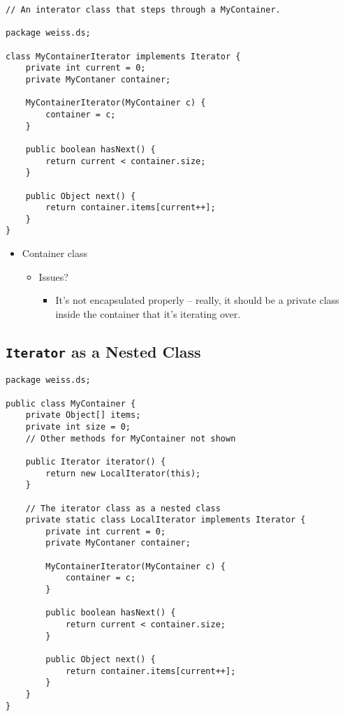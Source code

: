 \documentclass[10pt]{article}
\begin{document}
\begin{verbatim}
// An interator class that steps through a MyContainer.

package weiss.ds;

class MyContainerIterator implements Iterator {
    private int current = 0;
    private MyContaner container;
    
    MyContainerIterator(MyContainer c) {
        container = c;
    }
    
    public boolean hasNext() {
        return current < container.size;
    }

    public Object next() {
        return container.items[current++];
    }
}
\end{verbatim}


\begin{itemize}
    \item Container class
    \begin{itemize}
        \item Issues?
        \begin{itemize}
            \item It's not encapsulated properly -- really, it should be a private class inside the container that it's iterating over.
        \end{itemize}
    \end{itemize}
\end{itemize}


\subsection*{\texttt{Iterator} as a Nested Class}
\begin{verbatim}
package weiss.ds;

public class MyContainer {
    private Object[] items;
    private int size = 0;
    // Other methods for MyContainer not shown
    
    public Iterator iterator() {
        return new LocalIterator(this);
    }
    
    // The iterator class as a nested class
    private static class LocalIterator implements Iterator {
        private int current = 0;
        private MyContaner container;
        
        MyContainerIterator(MyContainer c) {
            container = c;
        }
        
        public boolean hasNext() {
            return current < container.size;
        }
    
        public Object next() {
            return container.items[current++];
        }
    }
}
\end{verbatim}
\end{document}

